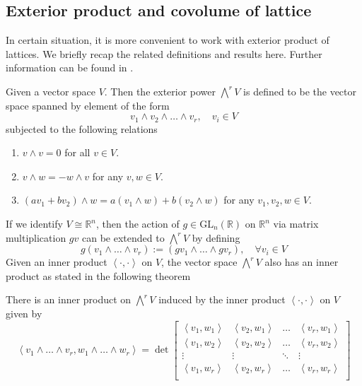 \subsection{Exterior product and covolume of lattice}
In certain situation, it is more convenient to work with exterior product of lattices. We briefly recap the related definitions and
results here. Further information can be found in \cite[Chapter 5]{MR504976}.
\begin{definition}
    Given a vector space $V$. Then the exterior power $\bigwedge^r V$ is defined to be the vector space spanned by element
    of the form \[v_1 \wedge v_2 \wedge \ldots \wedge v_r, \quad v_i \in V\]
    subjected to the following relations
    \begin{enumerate}
        \item $v \wedge v = 0$ for all $v \in V$.
        \item $v \wedge w = -w \wedge v$ for any $v,w \in V$.
        \item $(av_1+bv_2)\wedge w = a(v_1 \wedge w)+b(v_2 \wedge w)$ for any $v_1,v_2,w \in V$.
    \end{enumerate}
\end{definition}
If we identify $V \cong \mathbb{R}^n$, then the action of $g \in \mathrm{GL}_n(\mathbb{R})$ on $\mathbb{R}^n$ via matrix multiplication $gv$ can be extended
to $\bigwedge^r V$ by defining
\[g(v_1\wedge \ldots \wedge v_r):=(gv_1 \wedge \ldots \wedge gv_r),  \quad\forall v_i \in V\]
Given an inner product $\left\langle \cdot,\cdot \right\rangle$ on $V$, the vector space $\bigwedge^r V$ also has an inner product as stated in the following theorem
\begin{theorem}\label{wedge-inner-prod}\cite[Section 5.6]{MR504976}
    There is an inner product on $\bigwedge^r V$ induced by the inner product $\left\langle \cdot,\cdot \right\rangle$ on $V$ given by
    \[\left\langle v_1 \wedge \ldots \wedge v_r, w_1 \wedge \ldots \wedge w_r \right\rangle = \det
    \begin{bmatrix}
    \left\langle v_1,w_1\right\rangle      &    \left\langle v_2,w_1\right\rangle    & \ldots & \left\langle v_r,w_1\right\rangle             \\
     \left\langle v_1,w_2\right\rangle      &    \left\langle v_2,w_2\right\rangle    & \ldots & \left\langle v_r,w_2\right\rangle             \\
     \vdots & \vdots & \ddots & \vdots\\
      \left\langle v_1,w_r\right\rangle      &    \left\langle v_2,w_r\right\rangle    & \ldots & \left\langle v_r,w_r\right\rangle             \\
    \end{bmatrix}\]
\end{theorem}
